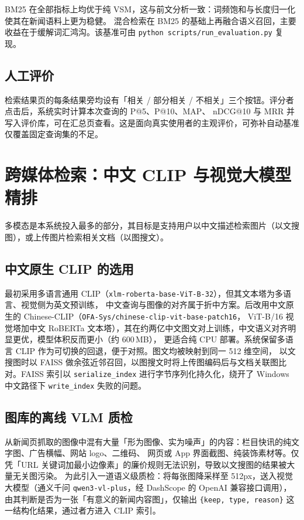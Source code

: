 \documentclass[11pt,a4paper]{ctexart}
\begin{document}
BM25 在全部指标上均优于纯 VSM，这与前文分析一致：词频饱和与长度归一化使其在新闻语料上更为稳健。
混合检索在 BM25 的基础上再融合语义召回，主要收益在于缓解词汇鸿沟。该基准可由 \texttt{python scripts/run\_evaluation.py} 复现。

\subsection{人工评价}

检索结果页的每条结果旁均设有「相关 / 部分相关 / 不相关」三个按钮。评分者点击后，系统实时计算本次查询的 P@5、P@10、MAP、
nDCG@10 与 MRR 并写入评价库，可在汇总页查看。这是面向真实使用者的主观评价，可弥补自动基准仅覆盖固定查询集的不足。

\section{跨媒体检索：中文 CLIP 与视觉大模型精排}

多模态是本系统投入最多的部分，其目标是支持用户以中文描述检索图片（以文搜图），或上传图片检索相关文档（以图搜文）。

\subsection{中文原生 CLIP 的选用}

最初采用多语言通用 CLIP（\texttt{xlm-roberta-base-ViT-B-32}），但其文本塔为多语言、视觉侧为英文预训练，
中文查询与图像的对齐属于折中方案。后改用中文原生的 Chinese-CLIP（\texttt{OFA-Sys/chinese-clip-vit-base-patch16}，
ViT-B/16 视觉塔加中文 RoBERTa 文本塔），其在约两亿中文图文对上训练，中文语义对齐明显更优，模型体积反而更小（约 600\,MB），
更适合纯 CPU 部署。系统保留多语言 CLIP 作为可切换的回退，便于对照。图文均被映射到同一 512 维空间，
以文搜图时以 FAISS 做余弦近邻召回，以图搜文时将上传图编码后与文档关联图比对。FAISS 索引以 \texttt{serialize\_index}
进行字节序列化持久化，绕开了 Windows 中文路径下 \texttt{write\_index} 失败的问题。

\subsection{图库的离线 VLM 质检}

从新闻页抓取的图像中混有大量「形为图像、实为噪声」的内容：栏目快讯的纯文字图、广告横幅、网站 logo、二维码、
网页或 App 界面截图、纯装饰素材等。仅凭「URL 关键词加最小边像素」的廉价规则无法识别，导致以文搜图的结果被大量无关图污染。
为此引入一道语义级质检：将每张图降采样至 512px，送入视觉大模型（通义千问 \texttt{qwen3-vl-plus}，经 DashScope 的 OpenAI 兼容接口调用），
由其判断是否为一张「有意义的新闻内容图」，仅输出 \texttt{\{keep, type, reason\}} 这一结构化结果，通过者方进入 CLIP 索引。
\end{document}
